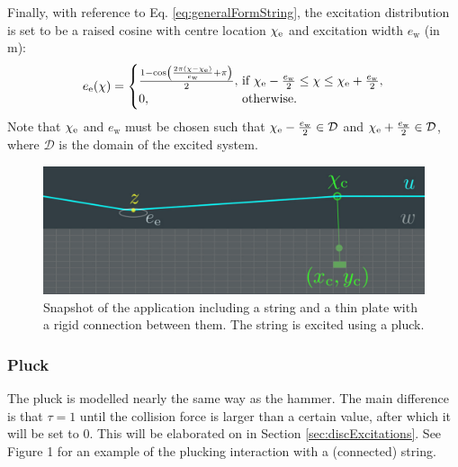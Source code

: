\documentclass{article}
\begin{document}
Finally, with reference to Eq. \eqref{eq:generalFormString}, the excitation distribution is set to be a raised cosine with centre location $\chi_{\text{e}}$ and excitation width $e_\text{w}$ (in m):
\begin{equation}\label{eq:raisedCos}
    e_\etxt(\chi) = \begin{cases}
        \frac{1 - \cos\left(\frac{2\pi (\chi - \chi_\etxt)}{e_\text{w}} + \pi\right)}{2},&\!\!\!\!\text{if}\ \chi_\etxt - \frac{e_\text{w}}{2}\leq \chi \leq \chi_\etxt + \frac{e_\text{w}}{2},\\
        0,& \!\!\!\!\text{otherwise.}
        \end{cases}
\end{equation}
Note that $\chi_{\text{e}} $ and $e_\text{w}$ must be chosen such that $\chi_{\text{e}} - \frac{e_\text{w}}{2}\in \mathcal{D}$ and $\chi_{\text{e}} + \frac{e_\text{w}}{2} \in \mathcal{D}$, where $\mathcal{D}$ is the domain of the excited system.
\begin{figure}[t]
    \centering
    \includegraphics[width = \columnwidth]{snapshot.pdf}
    \caption{Snapshot of the application including a string and a thin plate with a rigid connection between them. The string is excited using a pluck.}
    \label{fig:snapshot}
\end{figure}

\subsubsection{Pluck}
The pluck is modelled nearly the same way as the hammer. The main difference is that $\tau = 1$ until the collision force is larger than a certain value, after which it will be set to $0$. This will be elaborated on in Section \ref{sec:discExcitations}. See Figure 1 for an example of the plucking interaction with a (connected) string.
\end{document}
